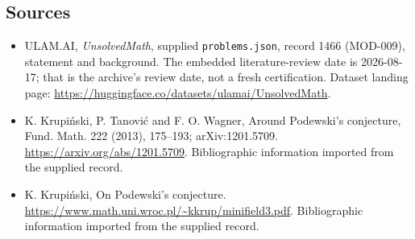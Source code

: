 \documentclass[11pt,a4paper]{article}
\begin{document}
\subsection{Sources}

{\small

\begin{itemize}

\item[\hypertarget{source:1466:1}{S1}] ULAM.AI, \emph{UnsolvedMath}, supplied \texttt{problems.json}, record 1466 (MOD-009), statement and background. The embedded literature-review date is 2026-08-17; that is the archive’s review date, not a fresh certification. Dataset landing page: \url{https://huggingface.co/datasets/ulamai/UnsolvedMath}.

\item[\hypertarget{source:1466:2}{S2}] K. Krupiński, P. Tanović and F. O. Wagner, Around Podewski's conjecture, Fund. Math. 222 (2013), 175--193; arXiv:1201.5709. \url{https://arxiv.org/abs/1201.5709}. Bibliographic information imported from the supplied record.

\item[\hypertarget{source:1466:3}{S3}] K. Krupiński, On Podewski's conjecture. \url{https://www.math.uni.wroc.pl/~kkrup/minifield3.pdf}. Bibliographic information imported from the supplied record.

\end{itemize}

}

\label{end:1466}
\end{document}
